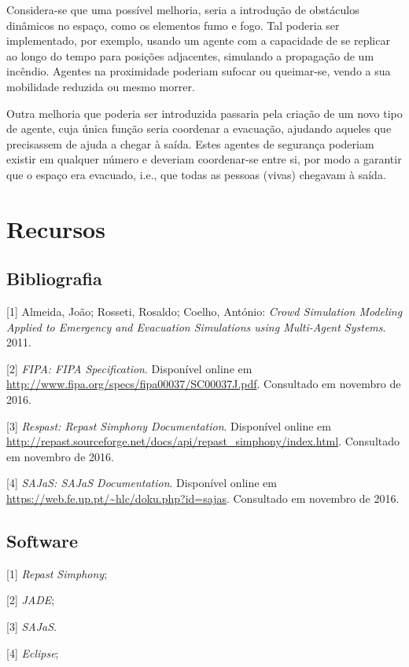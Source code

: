 \documentclass[12pt]{article}
\begin{document}
\begin{titlepage}
Considera-se que uma possível melhoria, seria a introdução de obstáculos dinâmicos no espaço, como os elementos fumo e fogo. Tal poderia ser implementado, por exemplo, usando um agente com a capacidade de se replicar ao longo do tempo para posições adjacentes, simulando a propagação de um incêndio. Agentes na proximidade poderiam sufocar ou queimar-se, vendo a sua mobilidade reduzida ou mesmo morrer.

Outra melhoria que poderia ser introduzida passaria pela criação de um novo tipo de agente, cuja única função seria coordenar a evacuação, ajudando aqueles que precisassem de ajuda a chegar à saída. Estes agentes de segurança poderiam existir em qualquer número e deveriam coordenar-se entre si, por modo a garantir que o espaço era evacuado, i.e., que todas as pessoas (vivas) chegavam à saída.



\section{Recursos}
\subsection{Bibliografia}
[1] Almeida, João; Rosseti, Rosaldo; Coelho, António: \textit{Crowd Simulation Modeling Applied to Emergency and Evacuation Simulations using Multi-Agent Systems}. 2011.

[2] \textit{FIPA: FIPA Specification}. Disponível online em \url{http://www.fipa.org/specs/fipa00037/SC00037J.pdf}. Consultado em novembro de 2016.

[3] \textit{Respast: Repast Simphony Documentation}. Disponível online em \url{http://repast.sourceforge.net/docs/api/repast_simphony/index.html}. Consultado em novembro de 2016.

[4] \textit{SAJaS: SAJaS Documentation}. Disponível online em \url{https://web.fe.up.pt/~hlc/doku.php?id=sajas}. Consultado em novembro de 2016.


\subsection{Software}
[1] \textit{Repast Simphony};

[2] \textit{JADE};

[3] \textit{SAJaS}.

[4] \textit{Eclipse};

\newpage


\end{titlepage}
\end{document}
